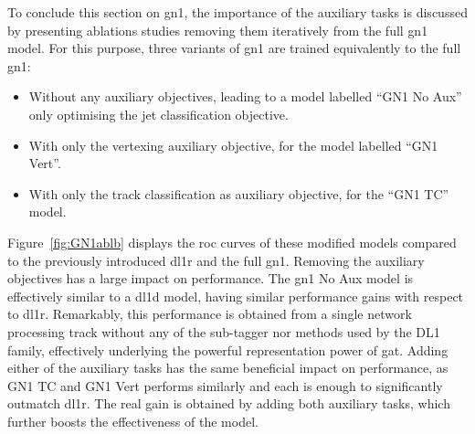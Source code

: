 To conclude this section on \gls{gn1}, the importance of the auxiliary tasks is discussed by presenting ablations studies removing them iteratively from the full \gls{gn1} model. For this purpose, three variants of \gls{gn1} are trained equivalently to the full \gls{gn1}:
\begin{itemize}
  \item Without any auxiliary objectives, leading to a model labelled ``GN1 No Aux'' only optimising the jet classification objective.
  \item With only the vertexing auxiliary objective, for the model labelled ``GN1 Vert''.
  \item With only the track classification as auxiliary objective, for the ``GN1 TC'' model.
\end{itemize}
Figure~\ref{fig:GN1ablb} displays the \gls{roc} curves of these modified models compared to the previously introduced \gls{dl1r} and the full \gls{gn1}. Removing the auxiliary objectives has a large impact on performance. The \gls{gn1} No Aux model is effectively similar to a \gls{dl1d} model, having similar performance gains with respect to \gls{dl1r}. Remarkably, this performance is obtained from a single network processing track without any of the sub-tagger nor methods used by the DL1 family, effectively underlying the powerful representation power of \gls{gat}. Adding either of the auxiliary tasks has the same beneficial impact on performance, as GN1 TC and GN1 Vert performs similarly and each is enough to significantly outmatch \gls{dl1r}. The real gain is obtained by adding both auxiliary tasks, which further boosts the effectiveness of the model.\\

